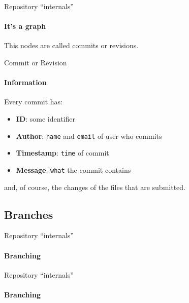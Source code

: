 \documentclass[aspectratio=169]{beamer}
\begin{document}
    \begin{frame}{Repository ``internals''}
      \framesubtitle{It's a graph}%
      \begin{figure}
      		\centering
      \end{figure}
  
  This nodes are called \alert{commits} or \alert{revisions}.
    \end{frame}

    \begin{frame}{Commit or Revision}
\framesubtitle{Information}%
Every commit has:
\begin{itemize}
	\item \textbf{ID}: some identifier
	\item \textbf{Author}: \texttt{name} and \texttt{email} of user who commits
	\item \textbf{Timestamp}: \texttt{time} of commit
	\item \textbf{Message}: \texttt{what} the commit contains
\end{itemize}
and, of course, the \alert{changes} of the files that are submitted.
\end{frame}

\subsection{Branches}
\begin{frame}{Repository ``internals''}
\framesubtitle{Branching}%
\begin{figure}
	\centering
\end{figure}
\end{frame}

\begin{frame}{Repository ``internals''}
\framesubtitle{Branching}%
\begin{figure}
	\centering
\end{figure}
\end{frame}
\end{document}
